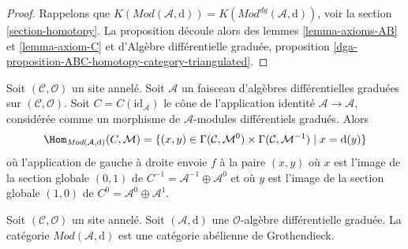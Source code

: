 \begin{proof}
Rappelons que $K(\textit{Mod}(\mathcal{A}, \text{d}))
= K(\textit{Mod}^{dg}(\mathcal{A}, \text{d}))$,
voir la section \ref{section-homotopy}.
La proposition découle
alors des lemmes \ref{lemma-axioms-AB} et \ref{lemma-axiom-C} et
d'Algèbre
différentielle graduée, proposition
\ref{dga-proposition-ABC-homotopy-category-triangulated}.
\end{proof}

\begin{remark}
\label{remark-cone-identity}
Soit $(\mathcal{C}, \mathcal{O})$ un site annelé. Soit
$\mathcal{A}$ un faisceau d'algèbres différentielles graduées
sur $(\mathcal{C}, \mathcal{O})$. Soit $C = C(\text{id}_\mathcal{A})$
le cône de l'application identité $\mathcal{A} \to \mathcal{A}$, considérée
comme un morphisme de $\mathcal{A}$-modules différentiels
gradués.
Alors $$
\Hom_{\textit{Mod}(\mathcal{A}, \text{d})}(C, \mathcal{M})
= \{(x, y) \in
\Gamma(\mathcal{C}, \mathcal{M}^0) \times
\Gamma(\mathcal{C}, \mathcal{M}^{-1}) \mid
x = \text{d}(y)\}
$$
où l'application de gauche à droite envoie $f$ à la paire $(x, y)$
où $x$ est l'image de la section globale $(0, 1)$
de $C^{-1} = \mathcal{A}^{-1} \oplus \mathcal{A}^0$ et
où $y$ est l'image de la section globale $(1, 0)$ de
$C^0 = \mathcal{A}^0 \oplus \mathcal{A}^1$.
\end{remark}

\begin{lemma}
\label{lemma-dgm-grothendieck-abelian}
Soit $(\mathcal{C}, \mathcal{O})$ un site annelé. Soit
$(\mathcal{A}, \text{d})$ une $\mathcal{O}$-algèbre différentielle graduée. La
catégorie $\textit{Mod}(\mathcal{A}, \text{d})$ est une
catégorie abélienne de Grothendieck.
\end{lemma}

